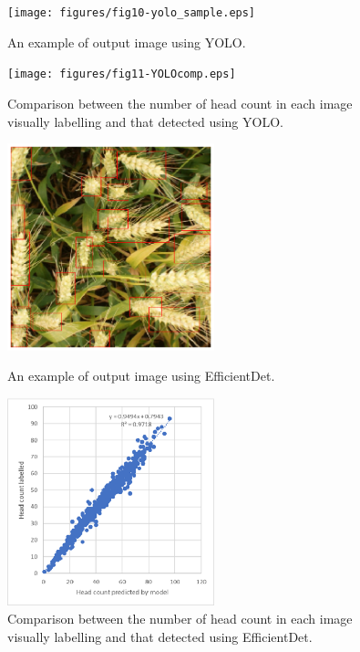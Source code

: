\documentclass[utf8]{frontiersSCNS} %
\begin{document}
\begin{figure}[H]
\centering
\texttt{[image: figures/fig10-yolo\_sample.eps]}
\caption{An example of output image using YOLO.}\label{fig:10}
\centering
\texttt{[image: figures/fig11-YOLOcomp.eps]}
\caption{Comparison between the number of head count in each image visually labelling and that detected using YOLO.}\label{fig:11}
\end{figure}

\begin{figure}[H]
\centering
\includegraphics[width=6cm]{figures/fig12-eff_sample.eps}
\caption{An example of output image using EfficientDet.}\label{fig:12}
\centering
\includegraphics[width=6cm]{figures/fig13-val_eff.eps}
\caption{Comparison between the number of head count in each image visually labelling and that detected using EfficientDet.}\label{fig:13}
\end{figure}
\end{document}
